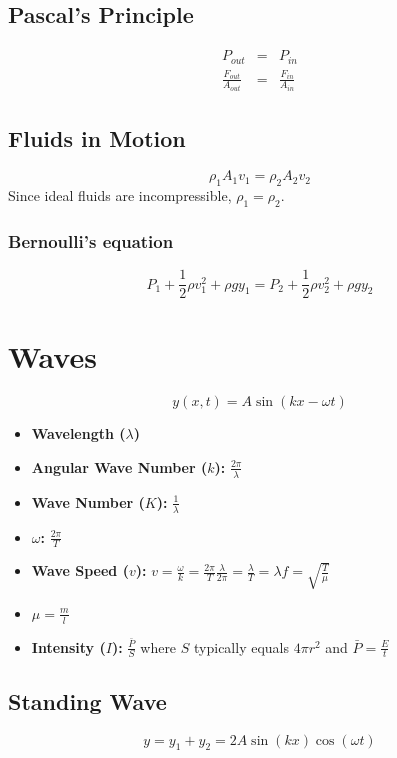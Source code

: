 \documentclass{article}
\begin{document}
\subsection{Pascal's Principle}
\begin{eqnarray}
P_{out} &=& P_{in} \\
\frac{F_{out}}{A_{out}} &=& \frac{F_{in}}{A_{in}}
\end{eqnarray}

\subsection{Fluids in Motion}
\begin{equation}
  \rho_1 A_1 v_1 = \rho_2 A_2 v_2
\end{equation}
Since ideal fluids are incompressible, $\rho_1 = \rho_2$.

\subsubsection{Bernoulli's equation}
\begin{equation}
  P_1 + \frac{1}{2}\rho v_1^2 + \rho g y_1 = P_2 + \frac{1}{2} \rho v_2^2 + \rho g y_2
\end{equation}

\section{Waves}
\begin{equation}
  y(x, t) = A \sin (kx - \omega t)
\end{equation}
\begin{itemize}
  \item \textbf{Wavelength ($\lambda$)}
  \item \textbf{Angular Wave Number ($k$):} $\frac{2 \pi}{\lambda}$
  \item \textbf{Wave Number ($K$):} $\frac{1}{\lambda}$
  \item \textbf{$\omega$:} $\frac{2 \pi}{T}$
  \item \textbf{Wave Speed ($v$):} $v = \frac{\omega}{k} = \frac{2 \pi}{T} \frac{\lambda}{2 \pi} = \frac{\lambda}{T} = \lambda f = \sqrt{\frac{T}{\mu}}$
  \item $\mu = \frac{m}{l}$
  \item \textbf{Intensity ($I$):} $\frac{\bar{P}}{S}$ where $S$ typically equals $4 \pi r^2$ and $\bar{P} = \frac{E}{t}$ 
\end{itemize}

\subsection{Standing Wave} %
\label{sub:StandingWave}
\begin{equation}
  y = y_1 + y_2 = 2A\sin (kx) \cos (\omega t)
\end{equation}
\end{document}
